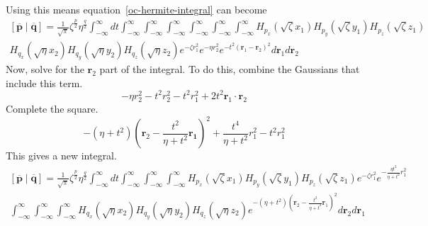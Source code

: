 \documentclass{article}
\begin{document}
Using this means equation~\ref{oc-hermite-integral} can become
\begin{multline}
  \left[\overline{\mathbf{p}}\middle|\overline{\mathbf{q}}\right] = \frac{1}{\sqrt{\pi}} \zeta^{\frac{p}{2}} \eta^{\frac{q}{2}} \int_{-\infty}^\infty dt \int_{-\infty}^\infty \int_{-\infty}^\infty \int_{-\infty}^\infty \int_{-\infty}^\infty \int_{-\infty}^\infty \int_{-\infty}^\infty H_{p_x}\left(\sqrt{\zeta} x_1\right) H_{p_y}\left(\sqrt{\zeta} y_1\right) H_{p_z}\left(\sqrt{\zeta} z_1\right) \\
  H_{q_x}\left(\sqrt{\eta}x_2\right)H_{q_y}\left(\sqrt{\eta}y_2\right)H_{q_z}\left(\sqrt{\eta}z_2\right) e^{-\zeta r_1^2}e^{-\eta r_2^2} e^{-t^2\left(\mathbf{r}_1 - \mathbf{r}_2\right)^2} d\mathbf{r}_1 d\mathbf{r}_2
\end{multline}
Now, solve for the $\mathbf{r}_2$ part of the integral. To do this, combine the Gaussians that include this term.
\begin{equation}
  -\eta r_2^2 - t^2 r_2^2 - t^2 r_1^2 + 2t^2 \mathbf{r}_1 \cdot \mathbf{r}_2
\end{equation}
Complete the square.
\begin{equation}
  -\left(\eta + t^2\right)\left(\mathbf{r}_2 - \frac{t^2}{\eta + t^2}\mathbf{r_1}\right)^2 + \frac{t^4}{\eta + t^2}r_1^2 - t^2r_1^2
\end{equation}
This gives a new integral.
\begin{multline}
  \left[\overline{\mathbf{p}}\middle|\overline{\mathbf{q}}\right] = \frac{1}{\sqrt{\pi}} \zeta^{\frac{p}{2}} \eta^{\frac{q}{2}} \int_{-\infty}^\infty dt \int_{-\infty}^\infty \int_{-\infty}^\infty \int_{-\infty}^\infty H_{p_x}\left(\sqrt{\zeta} x_1\right) H_{p_y}\left(\sqrt{\zeta} y_1\right) H_{p_z}\left(\sqrt{\zeta} z_1\right) e^{-\zeta r_1^2}e^{-\frac{\eta t^2}{\eta + t^2}r_1^2} \\
  \int_{-\infty}^\infty \int_{-\infty}^\infty \int_{-\infty}^\infty H_{q_x}\left(\sqrt{\eta}x_2\right)H_{q_y}\left(\sqrt{\eta}y_2\right)H_{q_z}\left(\sqrt{\eta}z_2\right) e^{-\left(\eta + t^2\right)\left(\mathbf{r}_2 - \frac{t^2}{\eta + t^2}\mathbf{r}_1\right)^2} d\mathbf{r}_2 d\mathbf{r}_1
\end{multline}
\end{document}
